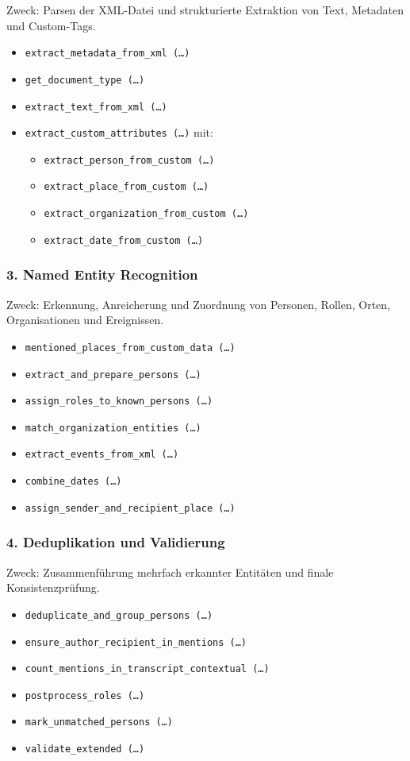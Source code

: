 \documentclass[12pt, a4paper, ngerman, bidi=default]{article}
\begin{document}
Zweck: Parsen der XML-Datei und strukturierte Extraktion von Text, Metadaten und Custom-Tags.
\begin{itemize}
\item \texttt{extract\_metadata\_from\_xml~(\dots)}
\item \texttt{get\_document\_type~(\dots)}
\item \texttt{extract\_text\_from\_xml~(\dots)}
\item \texttt{extract\_custom\_attributes~(\dots)} mit:
  \begin{itemize}
  \item \texttt{extract\_person\_from\_custom~(\dots)}
  \item \texttt{extract\_place\_from\_custom~(\dots)}
  \item \texttt{extract\_organization\_from\_custom~(\dots)}
  \item \texttt{extract\_date\_from\_custom~(\dots)}
  \end{itemize}
\end{itemize}

\subsubsection*{3. Named Entity Recognition}
Zweck: Erkennung, Anreicherung und Zuordnung von Personen, Rollen, Orten, Organisationen und Ereignissen.
\begin{itemize}
\item \texttt{mentioned\_places\_from\_custom\_data~(\dots)}
\item \texttt{extract\_and\_prepare\_persons~(\dots)}
\item \texttt{assign\_roles\_to\_known\_persons~(\dots)}
\item \texttt{match\_organization\_entities~(\dots)}
\item \texttt{extract\_events\_from\_xml~(\dots)}
\item \texttt{combine\_dates~(\dots)}
\item \texttt{assign\_sender\_and\_recipient\_place~(\dots)}
\end{itemize}


\subsubsection*{4. Deduplikation und Validierung}
Zweck: Zusammenführung mehrfach erkannter Entitäten und finale Konsistenzprüfung.
\begin{itemize}
\item \texttt{deduplicate\_and\_group\_persons~(\dots)}
\item \texttt{ensure\_author\_recipient\_in\_mentions~(\dots)}
\item \texttt{count\_mentions\_in\_transcript\_contextual~(\dots)}
\item \texttt{postprocess\_roles~(\dots)}
\item \texttt{mark\_unmatched\_persons~(\dots)}
\item \texttt{validate\_extended~(\dots)}
\end{itemize}
\end{document}
